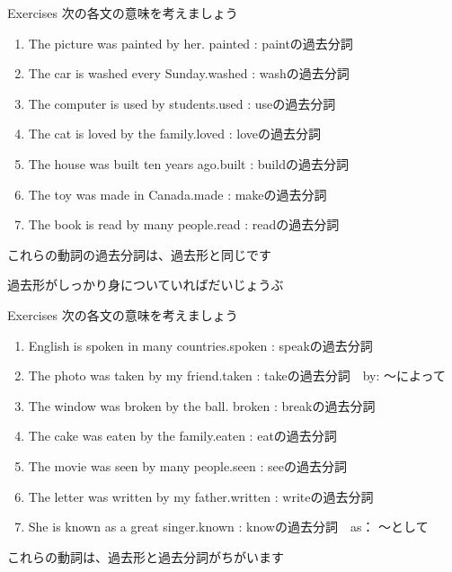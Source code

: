\documentclass[aspectratio=169,xcolor={dvipsnames,table}]{beamer}
\newcommand{\myaudio}[1]{\href{#1}{\faVolumeUp}}
\begin{document}
\begin{frame}[plain]{Exercises}
 次の各文の意味を考えましょう\hfill\myaudio{./audio/051_passive_02.mp3}


\begin{enumerate}
 \item The picture was painted by her.\hfill{}{ \scriptsize painted : paintの過去分詞}
 \item The car is washed every Sunday.\hfill{}{\scriptsize washed : washの過去分詞}
 \item The computer is used by students.\hfill{}{\scriptsize used  : useの過去分詞}
 \item The cat is loved by the family.\hfill{}{\scriptsize loved  : loveの過去分詞}
 \item The house was built ten years ago.\hfill{}{\scriptsize built  : buildの過去分詞}
 \item The toy was made in Canada.\hfill{}{\scriptsize made  : makeの過去分詞}
 \item The book is read by many people.\hfill{}{\scriptsize read  : readの過去分詞}
\end{enumerate}

\pause

これらの動詞の過去分詞は、過去形と同じです

\vspace{-5pt}

過去形がしっかり身についていればだいじょうぶ
\end{frame}
\begin{frame}[plain]{Exercises}
 次の各文の意味を考えましょう\hfill\myaudio{./audio/051_passive_03.mp3}


 \begin{enumerate}
\item English is spoken in many countries.\hfill{}{\scriptsize spoken  : speakの過去分詞}
\item The photo was taken by my friend.\hfill{}{\scriptsize taken  : takeの過去分詞　by: 〜によって}
\item The window was broken by the ball.\hfill{} {\scriptsize broken  : breakの過去分詞}
\item The cake was eaten by the family.\hfill{}{\scriptsize eaten  : eatの過去分詞}
\item The movie was seen by many people.\hfill{}{\scriptsize seen  : seeの過去分詞}
\item The letter was written by my father.\hfill{}{\scriptsize written  : writeの過去分詞}
\item She is known as a great singer.\hfill{}{\scriptsize known  : knowの過去分詞　as： 〜として}
\end{enumerate}

\pause

\hfill{}これらの動詞は、過去形と過去分詞がちがいます

\end{frame}
\end{document}
